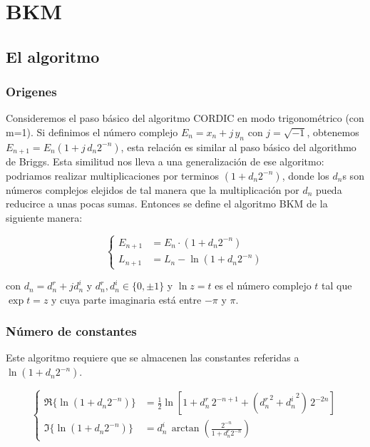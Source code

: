 \documentclass[10pt,a4paper]{book}
\begin{document}
\chapter{BKM}

   \section{El algoritmo}
   \subsection{Origenes}

   Consideremos el paso básico del algoritmo CORDIC en modo trigonométrico (con m=1).
   Si definimos el número complejo $E_n = x_n + j \, y_n$ con $j=\sqrt{-1}$, obtenemos $E_{n+1} = E_n (1+j \, d_n 2^{-n})$, esta relación es similar al paso básico del algorithmo de Briggs.
   Esta similitud nos lleva a una generalización de ese algoritmo: podriamos realizar multiplicaciones por terminos $(1+d_n 2^{-n})$, donde los $d_n$s son números complejos elejidos de tal manera que la multiplicación por $d_n$ pueda reducirce a unas pocas sumas.
   Entonces se define el algoritmo BKM de la siguiente manera:

\begin{equation} \label{eq:bkm_eqs}
   \left\{
      \begin{aligned}
         E_{n+1} &= E_n \cdot (1 + d_n 2^{-n})   \\
         L_{n+1} &= L_n - \ln(1 + d_n 2^{-n})
      \end{aligned}
   \right.
\end{equation}

   con $d_n = d_n^r + j d_n^i $ y $d_n^r, d_n^i \in \{ 0, \pm 1 \}$ y $\ln z = t$ es el número complejo $t$ tal que $\exp{t} = z$ y cuya parte imaginaria está entre $-\pi$ y $\pi$.


   \subsection{N\'umero de constantes}

   Este algoritmo requiere que se almacenen las constantes referidas a $\ln(1 + d_n 2^{-n})$.

   \begin{equation} \label{eq:bkm_constants}
      \left\{
         \begin{aligned}
            \Re \{\ln(1 + d_n 2^{-n})\} &= \frac{1}{2} \ln[ 1 + d_n^r \, 2^{-n+1} + ({d_n^r}^2 + {d_n^i}^2) \, 2^{-2n} ] \\
            \Im \{\ln(1 + d_n 2^{-n})\} &= d_n^i \, \arctan{ \left( \frac{2^{-n}}{1+d_n^r 2^{-n}} \right) }
         \end{aligned}
      \right.
   \end{equation}
\end{document}
